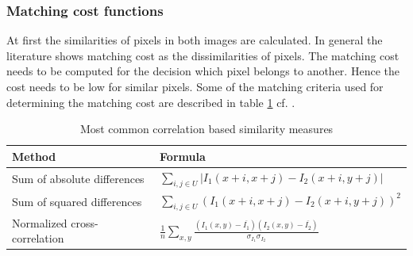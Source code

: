 \subsubsection{Matching cost functions}

At first the similarities of pixels in both images are calculated.
In general the literature shows matching cost as the dissimilarities of pixels.
The matching cost needs to be computed for the decision which pixel belongs to another.
Hence the cost needs to be low for similar pixels.
Some of the matching criteria used for determining the matching cost are described in table \ref{tab:overview-matching-cost-functions} cf. \citep{cyganek2011introduction, scharstein2002taxonomy, opencv_library, kanade1995development, hamzah2010sum}.

\begin{table}[h!]
\centering
\begin{tabular}{l|l}
  \hline
  \textbf{Method} & \textbf{Formula} \\ \hline \hline
  Sum of absolute differences & $\displaystyle \sum_{i,j \in U} \left| I_1(x+i,x+j) - I_2(x+i,y+j) \right|$ \\
  Sum of squared differences & $\displaystyle \sum_{i,j \in U} (I_1(x+i,x+j) - I_2(x+i,y+j))^2$ \\
  Normalized cross-correlation & $\displaystyle \frac{1}{n} \sum_{x,y}\frac{(I_1(x,y) - \overline{I_1})(I_2(x,y) - \overline{I_2})}{\sigma_{I_1} \sigma_{I_2}}$ \\
  \hline
\end{tabular}
\caption{Most common correlation based similarity measures}
\label{tab:overview-matching-cost-functions}
\end{table}


